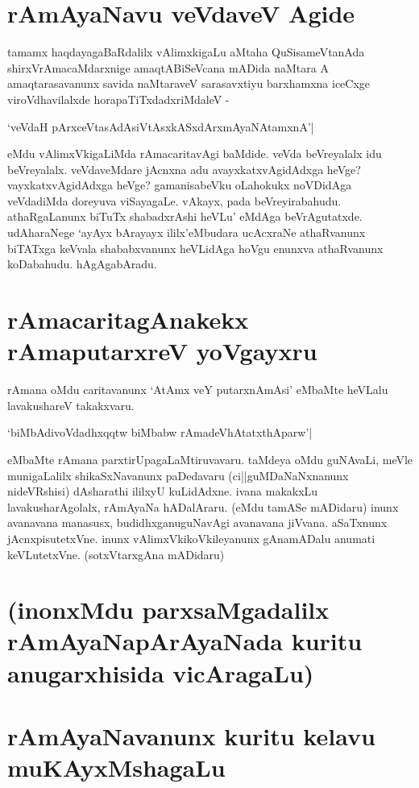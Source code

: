 \section*{rAmAyaNavu veVdaveV Agide}

tamamx haqdayagaBaRdalilx vAlimxkigaLu aMtaha QuSisameVtanAda shirxVrAmacaMdarxnige amaqtABiSeVcana mADida naMtara A amaqtarasavanunx savida naMtaraveV sarasavxtiyu barxhamxna iceCxge viroVdhavilalxde horapaTiTxdadxriMdaleV -

\begin{shloka}
`veVdaH pArxceVtasAdAsiVtAsxkASxdArxmAyaNAtamxnA'|\label{228b}
\end{shloka}
eMdu vAlimxVkigaLiMda rAmacaritavAgi baMdide. veVda beVreyalalx idu beVreyalalx. veVdaveMdare jAcnxna adu avayxkatxvAgidAdxga heVge? vayxkatxvAgidAdxga heVge? gamanisabeVku oLahokukx noVDidAga veVdadiMda doreyuva viSayagaLe. vAkayx, pada beVreyirabahudu. athaRgaLanunx biTuTx shabadxrAshi heVLu' eMdAga beVrAgutatxde. udAharaNege `ayAyx bArayayx ililx'eMbudara ucAcxraNe athaRvanunx biTATxga keVvala shababxvanunx heVLidAga hoVgu enunxva athaRvanunx koDabahudu. hAgAgabAradu.

\section*{rAmacaritagAnakekx rAmaputarxreV yoVgayxru}

rAmana oMdu caritavanunx `AtAmx veY putarxnAmAsi'\label{228} eMbaMte heVLalu lavakushareV takakxvaru.

\begin{shloka}
`biMbAdivoVdadhxqqtw biMbabw rAmadeVhAtatxthAparw'|\label{228a}
\end{shloka}
eMbaMte rAmana parxtirUpagaLaMtiruvavaru. taMdeya oMdu guNAvaLi, meVle munigaLalilx shikaSxNavanunx paDedavaru (ci||guMDaNaNxnanunx nideVRshisi) dAsharathi ililxyU kuLidAdxne. ivana makakxLu lavakusharAgolalx, rAmAyaNa hADalAraru. (eMdu tamASe mADidaru) inunx avanavana manasusx, budidhxganuguNavAgi avanavana jiVvana. aSaTxnunx jAcnxpisutetxVne. inunx vAlimxVkikoVkileyanunx gAnamADalu anumati keVLutetxVne. (sotxVtarxgAna mADidaru)

\section*{(inonxMdu parxsaMgadalilx rAmAyaNapArAyaNada kuritu anugarxhisida vicAragaLu)}

\section*{rAmAyaNavanunx kuritu kelavu muKAyxMshagaLu}

